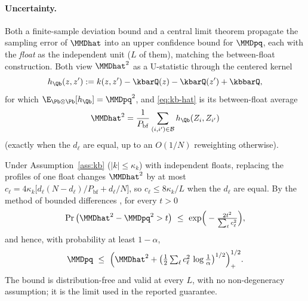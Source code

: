 \paragraph{Uncertainty.}
Both a finite-sample deviation bound and a central limit theorem propagate the
sampling error of $\MMDhat$ into an upper confidence bound for $\MMDpq$, each with
the \emph{float} as the independent unit ($L$ of them), matching the between-float
construction. Both view $\MMDhat^2$ as a U-statistic through the centered kernel
\[
  h_{\Qb}(z,z') := k(z,z')-\kbarQ(z)-\kbarQ(z')+\kbbarQ ,
\]
for which $\E_{\Pb\otimes\Pb}[h_{\Qb}]=\MMDpq^2$, and \eqref{eq:kb-hat} is its
between-float average
\[
  \MMDhat^2=\frac{1}{P_{\mathrm{bf}}}\sum_{(i,i')\in\mathcal B}h_{\Qb}(Z_i,Z_{i'})
\]
(exactly when the $d_\ell$ are equal, up to an $O(1/N)$ reweighting otherwise).

\begin{proposition}
\label{prop:kb-mcdiarmid}
Under Assumption~\ref{ass:kb} ($|k|\le\kappa_k$) with independent floats, replacing
the profiles of one float changes $\MMDhat^2$ by at most
$c_\ell=4\kappa_k\big[d_\ell(N-d_\ell)/P_{\mathrm{bf}}+d_\ell/N\big]$, so $c_\ell\le8\kappa_k/L$
when the $d_\ell$ are equal. By the method of bounded differences
\citep{mcdiarmid1989,gretton2012}, for every $t>0$
\[
  \Pr\big(\MMDhat^2-\MMDpq^2>t\big)\ \le\ \exp\!\Big(-\tfrac{2t^2}{\sum_\ell c_\ell^2}\Big),
\]
and hence, with probability at least $1-\alpha$,
\[
  \MMDpq\ \le\ \Big(\MMDhat^2+\big(\tfrac12\textstyle\sum_\ell c_\ell^2\,\log\tfrac1\alpha\big)^{1/2}\Big)_{+}^{1/2}.
\]
The bound is distribution-free and valid at every $L$, with no non-degeneracy
assumption; it is the limit used in the reported guarantee.
\end{proposition}

